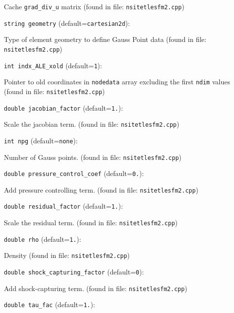 Cache  \verb+grad_div_u+  matrix
 (found in file: \verb+nsitetlesfm2.cpp+)
\item\verb+string geometry+ {\rm(default=\verb|cartesian2d|)}:

Type of element geometry to define Gauss Point data
 (found in file: \verb+nsitetlesfm2.cpp+)
\item\verb+int indx_ALE_xold+ {\rm(default=\verb|1|)}:

Pointer to old coordinates in
 \verb+nodedata+ array excluding the first \verb+ndim+ values
 (found in file: \verb+nsitetlesfm2.cpp+)
\item\verb+double jacobian_factor+ {\rm(default=\verb|1.|)}:

Scale the jacobian term. 
 (found in file: \verb+nsitetlesfm2.cpp+)
\item\verb+int npg+ {\rm(default=\verb|none|)}:

Number of Gauss points.
 (found in file: \verb+nsitetlesfm2.cpp+)
\item\verb+double pressure_control_coef+ {\rm(default=\verb|0.|)}:

Add pressure controlling term. 
 (found in file: \verb+nsitetlesfm2.cpp+)
\item\verb+double residual_factor+ {\rm(default=\verb|1.|)}:

Scale the residual term. 
 (found in file: \verb+nsitetlesfm2.cpp+)
\item\verb+double rho+ {\rm(default=\verb|1.|)}:

Density
 (found in file: \verb+nsitetlesfm2.cpp+)
\item\verb+double shock_capturing_factor+ {\rm(default=\verb|0|)}:

Add shock-capturing term.
 (found in file: \verb+nsitetlesfm2.cpp+)
\item\verb+double tau_fac+ {\rm(default=\verb|1.|)}:


